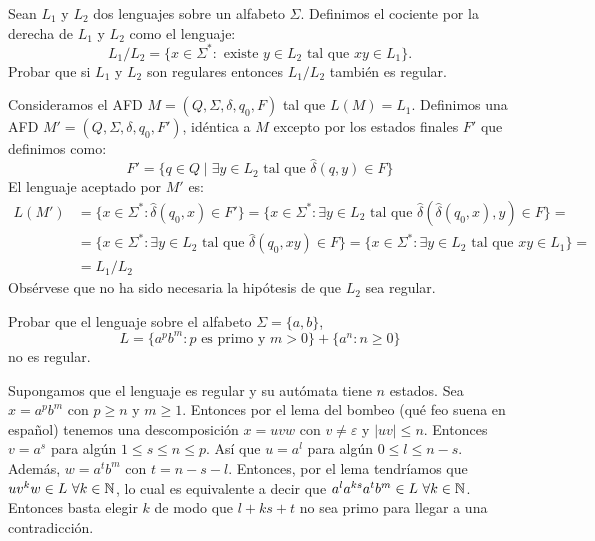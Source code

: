 \documentclass[twoside]{article}
\begin{document}
\newpage

\begin{ejercicio}{18}
Sean $L_1$ y $L_2$ dos lenguajes sobre un alfabeto $Σ$. Definimos el cociente por la derecha
de $L_1$ y $L_2$ como el lenguaje:
$$L_1/L_2 = \{x ∈ Σ^*
: \text{ existe } y ∈ L_2\text{ tal que }xy ∈ L_1\}.$$
Probar que si $L_1$ y $L_2$ son regulares entonces $L_1/L_2$ también es regular.
\end{ejercicio}
\begin{solucion}
Consideramos el AFD $M=(Q,Σ,δ,q_0,F)$ tal que $L(M)=L_1$. Definimos una AFD $M'=(Q,Σ,δ,q_0,F')$, idéntica a $M$ excepto por los estados finales $F'$ que definimos como:
\[ F' = \{q \in Q \mid \exists y \in L_2 \text{ tal que }\hat{δ}(q,y) \in F \}\]
El lenguaje aceptado por $M'$ es:
\begin{align*}
	L(M') & = \{x \in Σ^* : \hat{δ}(q_0,x) \in F'\} = \{x \in Σ^* : \exists y \in L_2 \text{ tal que } \hat{δ}(\hat{δ}(q_0,x),y) \in F\} =\\
	& = \{x \in Σ^* : \exists y \in L_2 \text{ tal que } \hat{δ}(q_0,xy) \in F\} = \{x \in Σ^* : \exists y \in L_2 \text{ tal que } xy \in L_1\}=\\
	& = L_1/L_2
\end{align*}
Obsérvese que no ha sido necesaria la hipótesis de que $L_2$ sea regular.
\end{solucion}

\newpage

\begin{ejercicio}{19}
Probar que el lenguaje sobre el alfabeto $Σ = \{a, b\}$,
$$L = \{a^pb^m : p \text{ es primo y }m > 0\} + \{a^n
: n ≥ 0\}$$
no es regular.
\end{ejercicio}
\begin{solucion}
Supongamos que el lenguaje es regular y su autómata tiene $n$ estados. Sea $x=a^pb^m$ con $p\geq n$ y $m\geq 1$. Entonces por el lema del bombeo (qué feo suena en español) tenemos una descomposición $x=uvw$ con $v\neq\varepsilon$ y $|uv|\leq n$. Entonces $v=a^s$ para algún $1\leq s\leq n\leq p$. Así que $u=a^l$ para algún $0\leq l\leq n-s$. Además, $w=a^tb^m$ con $t=n-s-l$. Entonces, por el lema tendríamos que $uv^kw\in L\ \forall k\in\mathbb{N}$, lo cual es equivalente a decir que $a^la^{ks}a^tb^m\in L\ \forall k\in\mathbb{N}$. Entonces basta elegir $k$ de modo que $l+ks+t$ no sea primo para llegar a una contradicción.
\end{solucion}
\end{document}
